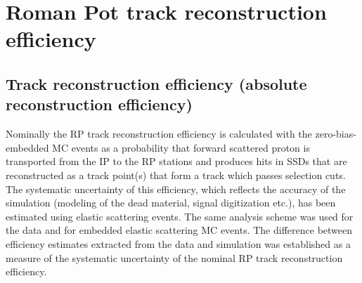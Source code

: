 \section{Roman Pot track reconstruction efficiency}\label{sec:rpTrackRecoEffSystematics}

\subsection{Track reconstruction efficiency (absolute reconstruction efficiency)}

Nominally the RP track reconstruction efficiency is calculated with the zero-bias-embedded MC events as a probability that forward scattered proton is transported from the IP to the RP stations and produces hits in SSDs that are reconstructed as a track point(s) that form a track which passes selection cuts. The systematic uncertainty of this efficiency, which reflects the accuracy of the simulation (modeling of the dead material, signal digitization etc.), has been estimated using elastic scattering events. The same analysis scheme was used for the data and for embedded elastic scattering MC events. The difference between efficiency estimates extracted from the data and simulation was established as a measure of the systematic uncertainty of the nominal RP track reconstruction efficiency.

